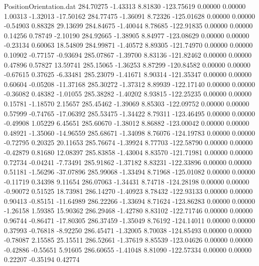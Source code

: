 \begin{filecontents}{PositionOrientation.dat}
 284.70275   -1.43313    8.81830  -123.75619    0.00000    0.00000    1.00313   -1.32013  -17.50162
 284.77475   -1.36091    8.72326  -125.01628    0.00000    0.00000   -0.54903    0.88328   29.13699
 284.84675   -1.40044    8.78685  -122.91835    0.00000    0.00000    0.14256    0.78749   -2.10190
 284.92665   -1.38905    8.84977  -123.08629    0.00000    0.00000   -0.23134    0.60063   18.54809
 284.99871   -1.40572    8.89305  -121.74970    0.00000    0.00000    0.10902   -0.77157   -0.93694
 285.07867   -1.39700    8.83136  -121.82462    0.00000    0.00000    0.47896    0.57827   13.59741
 285.15065   -1.36253    8.87299  -120.84582    0.00000    0.00000   -0.67615    0.37625   -6.33481
 285.23079   -1.41671    8.90314  -121.35347    0.00000    0.00000    0.60604   -0.05208  -11.37168
 285.30272   -1.37312    8.89939  -122.17140    0.00000    0.00000   -0.36082    0.48382   -1.01055
 285.38282   -1.40202    8.93815  -122.25235    0.00000    0.00000    0.15781   -1.18570    2.15657
 285.45462   -1.39069    8.85303  -122.09752    0.00000    0.00000    0.57999   -0.74765  -17.06392
 285.53475   -1.34422    8.79311  -123.46495    0.00000    0.00000   -0.49908    1.05229    6.45651
 285.60670   -1.38012    8.86882  -123.00042    0.00000    0.00000    0.48921   -1.35060  -14.96559
 285.68671   -1.34098    8.76076  -124.19783    0.00000    0.00000   -0.72795    0.20325   20.11653
 285.76674   -1.39924    8.77703  -122.58790    0.00000    0.00000   -0.42879    0.81680   12.08397
 285.83858   -1.43004    8.83570  -121.71981    0.00000    0.00000    0.72734   -0.04241   -7.73491
 285.91862   -1.37182    8.83231  -122.33896    0.00000    0.00000    0.51181   -1.56296  -37.07896
 285.99068   -1.33494    8.71968  -125.01082    0.00000    0.00000   -0.11719    0.34398    9.11654
 286.07063   -1.34431    8.74718  -124.28198    0.00000    0.00000   -0.90072    0.51525   18.73981
 286.14270   -1.40923    8.78432  -122.93133    0.00000    0.00000    0.90413   -0.85151  -11.64989
 286.22266   -1.33694    8.71624  -123.86283    0.00000    0.00000   -1.26158    1.59385   15.90362
 286.29468   -1.42780    8.83102  -122.71746    0.00000    0.00000    0.96744   -0.86471  -17.80305
 286.37459   -1.35049    8.76192  -124.14011    0.00000    0.00000    0.37993   -0.76818   -8.92250
 286.45471   -1.32005    8.70038  -124.85493    0.00000    0.00000   -0.78087    2.15585   25.15511
 286.52661   -1.37619    8.85539  -123.04626    0.00000    0.00000   -0.42886   -0.55651    5.91605
 286.60655   -1.41048    8.81090  -122.57334    0.00000    0.00000    0.22207   -0.35194    0.42774

\end{filecontents}
